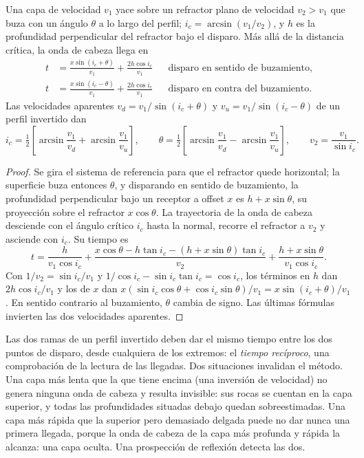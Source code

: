 \begin{theorem}\label{thm:b3:exploration-seismology:dipping}
Una capa de velocidad $v_1$ yace sobre un refractor plano de velocidad $v_2 > v_1$ que buza
con un ángulo $\theta$ a lo largo del perfil; $i_c = \arcsin(v_1/v_2)$, y $h$ es la
profundidad perpendicular del refractor bajo el disparo. Más allá de la
distancia crítica, la onda de cabeza llega en
\begin{align*}
  t &= \frac{x\sin(i_c + \theta)}{v_1} + \frac{2h\cos i_c}{v_1}
  &&\text{disparo en sentido de buzamiento},\\
  t &= \frac{x\sin(i_c - \theta)}{v_1} + \frac{2h\cos i_c}{v_1}
  &&\text{disparo en contra del buzamiento}.
\end{align*}
Las velocidades aparentes $v_d = v_1/\sin(i_c + \theta)$ y
$v_u = v_1/\sin(i_c - \theta)$ de un perfil invertido dan
\[
  i_c = \tfrac12\left[\arcsin\frac{v_1}{v_d} + \arcsin\frac{v_1}{v_u}\right],\qquad
  \theta = \tfrac12\left[\arcsin\frac{v_1}{v_d} - \arcsin\frac{v_1}{v_u}\right],
  \qquad v_2 = \frac{v_1}{\sin i_c} .
\]
\end{theorem}

\begin{proof}
Se gira el sistema de referencia para que el refractor quede horizontal; la superficie buza entonces
$\theta$, y disparando en sentido de buzamiento, la profundidad perpendicular bajo un receptor a
offset $x$ es $h + x\sin\theta$, su proyección sobre el refractor
$x\cos\theta$. La trayectoria de la onda de cabeza desciende con el ángulo crítico $i_c$ hasta la
normal, recorre el refractor a $v_2$ y asciende con $i_c$. Su tiempo es
\[
  t = \frac{h}{v_1\cos i_c} + \frac{x\cos\theta - h\tan i_c - (h + x\sin\theta)\tan i_c}{v_2}
  + \frac{h + x\sin\theta}{v_1\cos i_c}.
\]
Con $1/v_2 = \sin i_c/v_1$ y $1/\cos i_c - \sin i_c\tan i_c = \cos i_c$,
los términos en $h$ dan $2h\cos i_c/v_1$ y los de $x$ dan
  $x(\sin i_c\cos\theta + \cos i_c\sin\theta)/v_1 = x\sin(i_c + \theta)/v_1$.
En sentido contrario al buzamiento, $\theta$ cambia de signo. Las últimas fórmulas invierten las dos
velocidades aparentes.
\end{proof}

Las dos ramas de un perfil invertido deben dar el mismo tiempo entre los dos
puntos de disparo, desde cualquiera de los extremos: el \emph{tiempo recíproco}, una comprobación de la
lectura de las llegadas. Dos situaciones invalidan el método. Una capa más lenta que la que tiene encima
(una inversión de velocidad) no genera ninguna onda de cabeza y resulta invisible: sus rocas se
cuentan en la capa superior, y todas las profundidades situadas debajo quedan sobreestimadas. Una capa
más rápida que la superior pero demasiado delgada puede no dar nunca una primera llegada, porque
la onda de cabeza de la capa más profunda y rápida la alcanza: una capa oculta. Una
prospección de reflexión detecta las dos.

